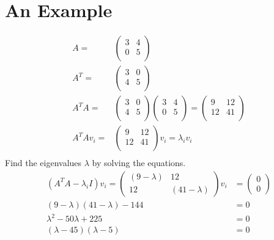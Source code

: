 \documentclass{article}
\begin{document}
\section{An Example }
\begin{align*}
    A=        & \begin{pmatrix}
        3 & 4 \\0&5\\
    \end{pmatrix}                                                    \\
    A^T=      & \begin{pmatrix}
        3 & 0 \\4&5\\
    \end{pmatrix}                                                    \\
    A^T A=    & \begin{pmatrix}
        3 & 0 \\4&5\\
    \end{pmatrix}\begin{pmatrix}
        3 & 4 \\0&5\\
    \end{pmatrix}=\begin{pmatrix}
        9 & 12 \\12&41\\
    \end{pmatrix} \\
    A^T Av_i= & \begin{pmatrix}
        9 & 12 \\12&41\\
    \end{pmatrix}v_i=\lambda_i  v_i                                  \\
\end{align*}
Find the eigenvalues $\lambda$ by solving the equations.
\begin{align*}
    (A^T A-\lambda_i I)v_i=\begin{pmatrix}
        (9-\lambda) & 12 \\12 &(41-\lambda)
    \end{pmatrix}v_i & =  \begin{pmatrix}
        0 \\0
    \end{pmatrix}     \\
    (9-\lambda)(41-\lambda)-144                         & =                           0    \\
    \lambda^2 -50\lambda+225                            & =                              0 \\
    (\lambda-45)(\lambda-5)                             & =0
\end{align*}
\end{document}

